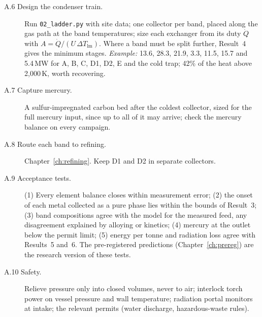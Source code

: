 \documentclass[11pt,a4paper]{article}
\begin{document}
\begin{description}
\item[A.6 Design the condenser train.] Run \texttt{02\_ladder.py} with site data; one collector per band, placed along the gas path at the band temperatures; size each exchanger from its duty $\dot Q$ with $A = \dot Q/(U\,\Delta T_{\mathrm{lm}})$. Where a band must be split further, Result~4 gives the minimum stages. \emph{Example:} 13.6, 28.3, 21.9, 3.3, 11.5, 15.7 and 5.4\,MW for A, B, C, D1, D2, E and the cold trap; 42\% of the heat above 2,000\,K, worth recovering.
\item[A.7 Capture mercury.] A sulfur-impregnated carbon bed after the coldest collector, sized for the full mercury input, since up to all of it may arrive; check the mercury balance on every campaign.
\item[A.8 Route each band to refining.] Chapter~\ref{ch:refining}. Keep D1 and D2 in separate collectors.
\item[A.9 Acceptance tests.] (1) Every element balance closes within measurement error; (2) the onset of each metal collected as a pure phase lies within the bounds of Result~3; (3) band compositions agree with the model for the measured feed, any disagreement explained by alloying or kinetics; (4) mercury at the outlet below the permit limit; (5) energy per tonne and radiation loss agree with Results~5 and~6. The pre-registered predictions (Chapter~\ref{ch:prereg}) are the research version of these tests.
\item[A.10 Safety.] Relieve pressure only into closed volumes, never to air; interlock torch power on vessel pressure and wall temperature; radiation portal monitors at intake; the relevant permits (water discharge, hazardous-waste rules).
\end{description}

\end{document}
